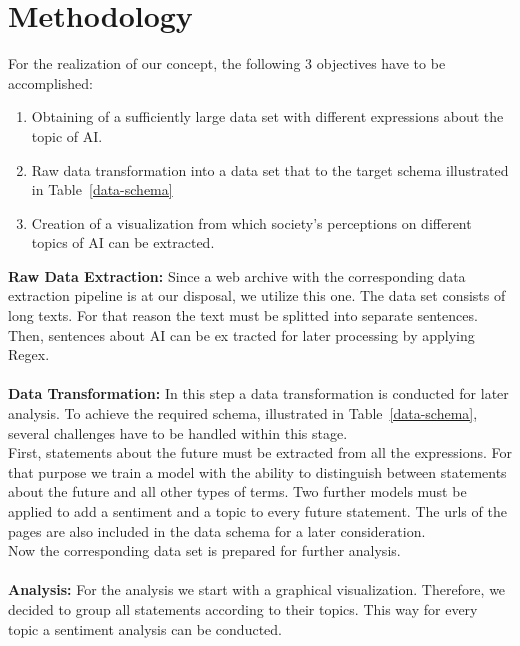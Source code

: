 \section{Methodology}

For the realization of our concept, the following 3 objectives have to be accomplished:

\begin{enumerate}
    \item Obtaining of a sufficiently large data set with different expressions about the topic of AI.
    \item Raw data transformation into a data set that to the target schema illustrated in Table~\ref{data-schema}
    \item Creation of a visualization from which society's perceptions on different topics of AI can be extracted.
\end{enumerate}%
%
%
\textbf{Raw Data Extraction:}
Since a web archive with the corresponding data extraction pipeline is at our disposal, we utilize this one.
The data set consists of long texts.
For that reason the text must be splitted into separate sentences.
Then, sentences about AI can be ex tracted for later processing by applying Regex.
\\
\\
%
\textbf{Data Transformation:}
In this step a data transformation is conducted for later analysis.
To achieve the required schema, illustrated in Table~\ref{data-schema}, several challenges have to be handled within this stage.
\\
First, statements about the future must be extracted from all the expressions.
For that purpose we train a model with the ability to distinguish between statements about the future and all other types of terms.
Two further models must be applied to add a sentiment and a topic to every future statement.
The urls of the pages are also included in the data schema for a later consideration.
\\
Now the corresponding data set is prepared for further analysis.
\\
\\
\textbf{Analysis:}
For the analysis we start with a graphical visualization.
Therefore, we decided to group all statements according to their topics.
This way for every topic a sentiment analysis can be conducted.


